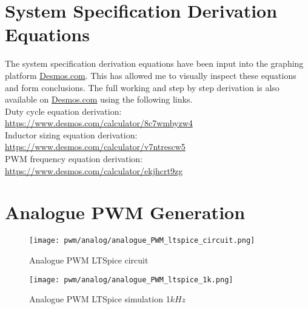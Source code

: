 


% 




\chapter{System Specification Derivation Equations} \label{A:specs}

The system specification derivation equations have been input into the graphing platform \url{Desmos.com}. This has allowed me to visually inspect these equations and form conclusions. The full working and step by step derivation is also available on \url{Desmos.com} using the following links.\\

Duty cycle equation derivation:\\
\url{https://www.desmos.com/calculator/8c7wmbyzw4}\\

Inductor sizing equation derivation:\\ 
\url{https://www.desmos.com/calculator/v7ntrescw5}\\

PWM frequency equation derivation:\\ 
\url{https://www.desmos.com/calculator/ekjhcrt9zg}\\

\chapter{Analogue PWM Generation} \label{A:analogue_PWM}


\begin{figure}[H]
    \texttt{[image: pwm/analog/analogue\_PWM\_ltspice\_circuit.png]}
    \caption{Analogue PWM LTSpice circuit}
\end{figure}

\begin{figure}[H]
    \texttt{[image: pwm/analog/analogue\_PWM\_ltspice\_1k.png]}
    \caption{Analogue PWM LTSpice simulation 1$kHz$}
\end{figure}

